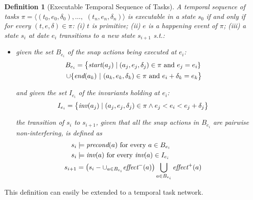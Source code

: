 \documentclass[letterpaper]{article} %
\newtheorem{definition}{Definition}
\newcommand{\pre}{\text{\it precond}}
\newcommand{\add}{\text{\it effect}^{+}}
\newcommand{\del}{\text{\it effect}^{-}}
\newcommand{\tstart}{\text{\it start}}
\newcommand{\tend}{\text{\it end}}
\newcommand{\tinv}{\text{\it inv}}
\begin{document}
\begin{definition}[Executable Temporal Sequence of Tasks]
  A temporal sequence of tasks $\pi = \langle (t_0, e_0, \delta_0), \ldots,$ $(t_n, e_n, \delta_n) \rangle$ is executable in a state $s_0$ if and only if for every $(t, e, \delta) \in \pi$:
  (i) $t$ is primitive;
  (ii) $e$ is a happening event of $\pi$;
  (iii) %
  a state $s_i$ at date $e_i$ transitions to a new state $s_{i+1}$ s.t.: 
\begin{itemize}
  \item given the set  $B_{e_i}$ of the snap actions being executed at $e_i$:
    \begin{multline*}
      B_{e_i} = \bigl\{ \tstart(a_j) \; | \;  (a_j, e_j, \delta_j) \in \pi \text{ and } e_j = e_i \}\\
      \; \cup  \{\tend(a_k) \ | \ (a_k, e_k, \delta_k) \in \pi \text{ and } e_i + \delta_k = e_k\bigr\}
    \end{multline*}
    
 and given the set $I_{e_i}$ of the invariants holding at $e_i$:
    \begin{equation*}
      I_{e_i} = \bigl\{ \tinv(a_j) \; | \; (a_j, e_j, \delta_j) \in \pi \wedge e_j < e_i < e_j + \delta_j\bigr\}
    \end{equation*}

    the transition of $s_i$ to  $s_{i+1}$, given that all the snap actions in $B_{e_i}$ are \emph{pairwise non-interfering}, is defined as   %
      \begin{align*}
       s_i& \models \pre(a) \text{ for every } a \in B_{e_i}\\
       s_i& \models \tinv(a) \text{ for every }\tinv(a) \in I_{e_i}\\
       s_{i+1}& = \left(s_i - \cup_{a \in B_{e_i}} \del(a)\right) \bigcup_{a \in B_{e_i}} \add(a)       
      \end{align*}
\end{itemize}
\end{definition}


 This definition can easily be extended to a temporal task network.
\end{document}
